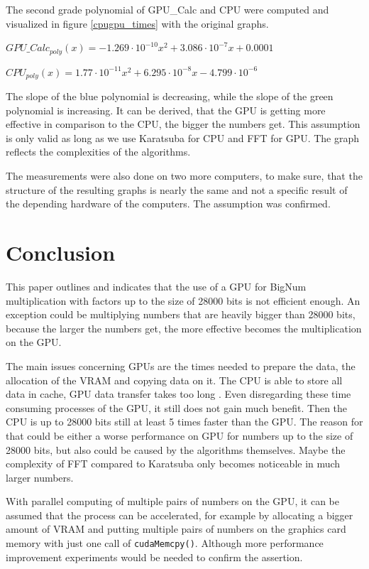 \documentclass[12pt,a4paper]{article}
\begin{document}
The second grade polynomial of GPU\_Calc and CPU were computed and visualized in figure \ref{cpugpu_times} with the original graphs.
 
\begin{center}
    $GPU\_Calc_{poly}(x) = -1.269 \cdot 10^{-10}x^2 + 3.086 \cdot 10^{-7}x + 0.0001$
\end{center}

\begin{center}
    $CPU_{poly}(x) = 1.77 \cdot 10^{-11}x^2 + 6.295 \cdot 10^{-8}x - 4.799 \cdot 10^{-6}$
\end{center}

The slope of the blue polynomial is decreasing, while the slope of the green polynomial is increasing. It can be derived, that the GPU is getting more effective in comparison to the CPU, the bigger the numbers get. This assumption is only valid as long as we use Karatsuba for CPU and FFT for GPU. The graph reflects the complexities of the algorithms.

The measurements were also done on two more computers, to make sure, that the structure of the resulting graphs is nearly the same and not a specific result of the depending hardware of the computers. The assumption was confirmed.

\section{Conclusion}
This paper outlines and indicates that the use of a GPU for BigNum multiplication with factors up to the size of 28000 bits is not efficient enough. An exception could be multiplying numbers that are heavily bigger than 28000 bits, because the larger the numbers get, the more effective becomes the multiplication on the GPU. 

The main issues concerning GPUs are the times needed to prepare the data, the allocation of the VRAM and copying data on it. The CPU is able to store all data in cache, GPU data transfer takes too long \cite{cooper2011gpu}. Even disregarding these time consuming processes of the GPU, it still does not gain much benefit. Then the CPU is up to 28000 bits still at least 5 times faster than the GPU. The reason for that could be either a worse performance on GPU for numbers up to the size of 28000 bits, but also could  be caused by the algorithms themselves. Maybe the complexity of FFT compared to Karatsuba only becomes noticeable in much larger numbers.

 With parallel computing of multiple pairs of numbers on the GPU, it can be assumed that the process can be accelerated, for example by allocating a bigger amount of VRAM and putting multiple pairs of numbers on the graphics card memory with just one call of \texttt{cudaMemcpy()}. Although more performance improvement experiments would be needed to confirm the assertion.


\end{document}
